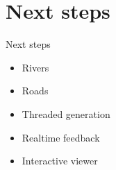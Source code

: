 \documentclass[english,aspectratio=43]{beamer}
\begin{document}
	\section{Next steps}
	\begin{frame}{Next steps}
		\begin{itemize}
			\item Rivers
			\item Roads
			\item Threaded generation
			\item Realtime feedback
			\item Interactive viewer
		\end{itemize}
	\end{frame}

	\begin{frame}{}
	\end{frame}
\end{document}

